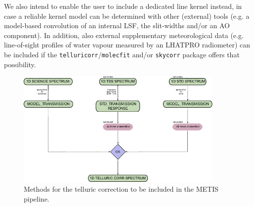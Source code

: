 We also intend to enable the user to include a dedicated line kernel instead, in case a reliable kernel model can be determined with other (external) tools (e.g. a model-based convolution of an internal \ac{LSF}, the slit-widths and/or an \ac{AO} component). In addition, also external supplementary meteorological data (e.g. line-of-sight profiles of water vapour measured by an \ac{LHATPRO} radiometer) can be included if the \texttt{telluricorr}/\texttt{molecfit} and/or \texttt{skycorr} package offers that possibility. 
\begin{figure}[ht]
  \centering
  \includegraphics[width=0.9\textwidth]{figures/tell_corr_methods.pdf}
    \caption[Methods for the telluric correction to be included in the METIS pipeline]{%
        Methods for the telluric correction to be included in the \ac{METIS} pipeline.}
  \label{Fig:tellcorrmethods}
\end{figure}
